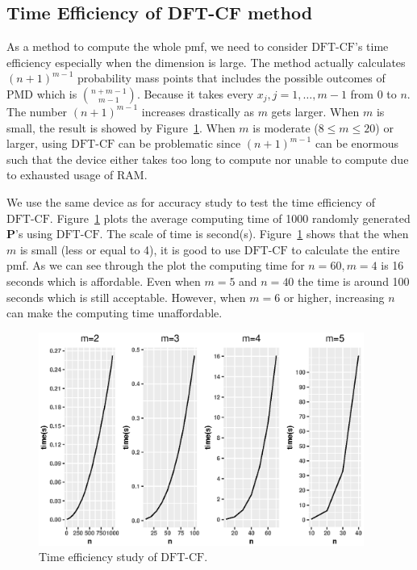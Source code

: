 \documentclass[12pt]{article}
\newcommand{\Pmat}{\mathbf{P}}
\newcommand{\PMD}{\textrm{PMD}}
\newcommand{\dft}{{\textrm{DFT-CF}}}
\begin{document}
\subsection{Time Efficiency of DFT-CF method}
As a method to compute the whole pmf, we need to consider $\dft$'s time efficiency especially when the dimension is large. The method actually calculates $(n+1)^{m-1}$ probability mass points that includes the possible outcomes of $\PMD$ which is $\binom{n+m-1}{m-1}$. Because it takes every $x_j,j=1,\dots,m-1$ from 0 to $n$. The number $(n+1)^{m-1}$ increases drastically as $m$ gets larger. When $m$ is small, the result is showed by Figure~\ref{fig:time.eff}. When $m$ is moderate ($8 \leq m \leq 20$) or larger, using $\dft$ can be problematic since $(n+1)^{m-1}$ can be enormous such that the device either takes too long to compute nor unable to compute due to exhausted usage of RAM.

We use the same device as for accuracy study to test the time efficiency of $\dft$. Figure~\ref{fig:time.eff} plots the average computing time of 1000 randomly generated $\Pmat$'s using $\dft$. The scale of time is second(s). Figure~\ref{fig:time.eff} shows that the when $m$ is small (less or equal to 4), it is good to use $\dft$ to calculate the entire pmf. As we can see through the plot the computing time for $n=60, m=4$ is 16 seconds which is affordable. Even when $m=5$ and $n=40$ the time is around 100 seconds which is still acceptable. However, when $m=6$ or higher, increasing $n$ can make the computing time unaffordable.


\begin{figure}%
\begin{center}
	\includegraphics[width=0.95\textwidth]{figures/effi.eps}
	\caption{Time efficiency study of $\dft$.}
	\label{fig:time.eff}
\end{center}
\end{figure}
\end{document}
